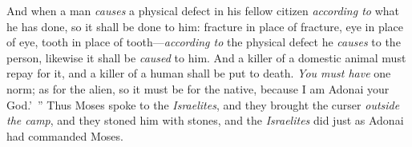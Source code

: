 \begin{biblechapter}
\verse And when a man \textit{causes} a physical defect in his fellow citizen \textit{according to} what he has done, so it shall be done to him:
\verse fracture in place of fracture, eye in place of eye, tooth in place of tooth—\textit{according to} the physical defect he \textit{causes} to the person, likewise it shall be \textit{caused} to him.
\verse And a killer of a domestic animal must repay for it, and a killer of a human shall be put to death.
\verse \textit{You must have} one norm; as for the alien, so it must be for the native, because I am Adonai your God.’ ”
\verse Thus Moses spoke to the \textit{Israelites}, and they brought the curser \textit{outside the camp}, and they stoned him with stones, and the \textit{Israelites} did just as Adonai had commanded Moses.
\end{biblechapter}

